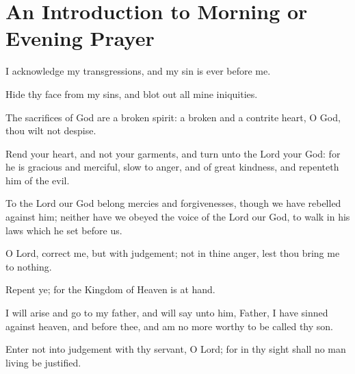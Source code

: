 \chapter[An Introduction]{An Introduction to Morning or Evening Prayer}


\bigskip



I acknowledge my transgressions, and my sin is ever before me.

Hide thy face from my sins, and blot out all mine iniquities.

The sacrifices of God are a broken spirit: a broken and a contrite heart, O God, thou wilt not despise.

Rend your heart, and not your garments, and turn unto the Lord your God: for he is gracious and merciful, slow to anger, and of great kindness, and repenteth him of the evil.

To the Lord our God belong mercies and forgivenesses, though we have rebelled against him; neither have we obeyed the voice of the Lord our God, to walk in his laws which he set before us.

O Lord, correct me, but with judgement; not in thine anger, lest thou bring me to nothing.\par{}

Repent ye; for the Kingdom of Heaven is at hand.

I will arise and go to my father, and will say unto him, Father, I have sinned against heaven, and before thee, and am no more worthy to be called thy son.

Enter not into judgement with thy servant, O Lord; for in thy sight shall no man living be justified.

